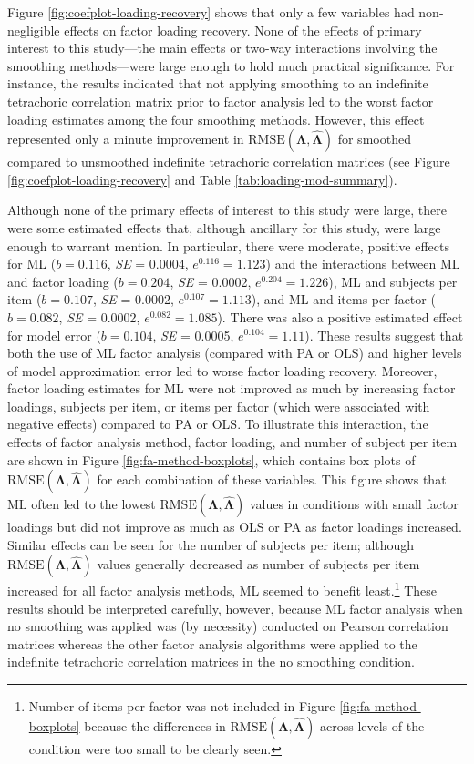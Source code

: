 \documentclass[
  english,
  man]{apa6}
\begin{document}
Figure \ref{fig:coefplot-loading-recovery} shows that only a few variables had non-negligible effects on factor loading recovery. None of the effects of primary interest to this study---the main effects or two-way interactions involving the smoothing methods---were large enough to hold much practical significance. For instance, the results indicated that not applying smoothing to an indefinite tetrachoric correlation matrix prior to factor analysis led to the worst factor loading estimates among the four smoothing methods. However, this effect represented only a minute improvement in \(\textrm{RMSE}(\mathbf{\Lambda}, \hat{\mathbf{\Lambda}})\) for smoothed compared to unsmoothed indefinite tetrachoric correlation matrices (see Figure \ref{fig:coefplot-loading-recovery} and Table \ref{tab:loading-mod-summary}).

Although none of the primary effects of interest to this study were large, there were some estimated effects that, although ancillary for this study, were large enough to warrant mention. In particular, there were moderate, positive effects for ML (\(b = 0.116\), \emph{SE} = 0.0004, \(e^{0.116} = 1.123\)) and the interactions between ML and factor loading (\(b = 0.204\), \emph{SE} = 0.0002, \(e^{0.204} = 1.226\)), ML and subjects per item (\(b = 0.107\), \emph{SE} = 0.0002, \(e^{0.107} = 1.113\)), and ML and items per factor (\(b = 0.082\), \emph{SE} = 0.0002, \(e^{0.082} = 1.085\)). There was also a positive estimated effect for model error (\(b = 0.104\), \emph{SE} = 0.0005, \(e^{0.104} = 1.11\)). These results suggest that both the use of ML factor analysis (compared with PA or OLS) and higher levels of model approximation error led to worse factor loading recovery. Moreover, factor loading estimates for ML were not improved as much by increasing factor loadings, subjects per item, or items per factor (which were associated with negative effects) compared to PA or OLS. To illustrate this interaction, the effects of factor analysis method, factor loading, and number of subject per item are shown in Figure \ref{fig:fa-method-boxplots}, which contains box plots of \(\textrm{RMSE}(\mathbf{\Lambda}, \hat{\mathbf{\Lambda}})\) for each combination of these variables. This figure shows that ML often led to the lowest \(\textrm{RMSE}(\mathbf{\Lambda}, \hat{\mathbf{\Lambda}})\) values in conditions with small factor loadings but did not improve as much as OLS or PA as factor loadings increased. Similar effects can be seen for the number of subjects per item; although \(\textrm{RMSE}(\mathbf{\Lambda}, \hat{\mathbf{\Lambda}})\) values generally decreased as number of subjects per item increased for all factor analysis methods, ML seemed to benefit least.\footnote{Number of items per factor was not included in Figure \ref{fig:fa-method-boxplots} because the differences in \(\textrm{RMSE}(\mathbf{\Lambda}, \hat{\mathbf{\Lambda}})\) across levels of the condition were too small to be clearly seen.} These results should be interpreted carefully, however, because ML factor analysis when no smoothing was applied was (by necessity) conducted on Pearson correlation matrices whereas the other factor analysis algorithms were applied to the indefinite tetrachoric correlation matrices in the no smoothing condition.
\end{document}

